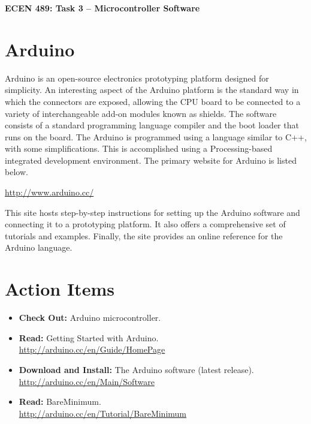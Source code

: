 \documentclass[11pt]{article}
\begin{document}
\begin{center}
{\bfseries \LARGE ECEN 489: Task 3 -- Microcontroller Software\\[8mm]}
\end{center}


\section{Arduino}

Arduino is an open-source electronics prototyping platform designed for simplicity.
An interesting aspect of the Arduino platform is the standard way in which the connectors are exposed, allowing the CPU board to be connected to a variety of interchangeable add-on modules known as shields.
The software consists of a standard programming language compiler and the boot loader that runs on the board.
The Arduino is programmed using a language similar to C++, with some simplifications.
This is accomplished using a Processing-based integrated development environment.
The primary website for Arduino is listed below.
\begin{center}
\url{http://www.arduino.cc/}
\end{center}
This site hosts step-by-step instructions for setting up the Arduino software and connecting it to a prototyping platform.
It also offers a comprehensive set of tutorials and examples.
Finally, the site provides an online reference for the Arduino language.

\section*{Action Items}

\begin{itemize}
\item \textbf{Check Out:} Arduino microcontroller.
\item \textbf{Read:} Getting Started with Arduino. \\
\url{http://arduino.cc/en/Guide/HomePage}
\item \textbf{Download and Install:} The Arduino software (latest release). \\
\url{http://arduino.cc/en/Main/Software}
\item \textbf{Read:} BareMinimum. \\
\url{http://arduino.cc/en/Tutorial/BareMinimum}
\end{itemize}
\end{document}
